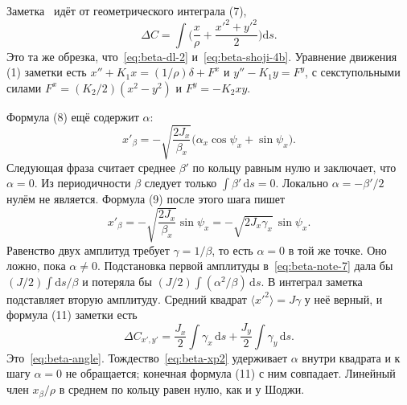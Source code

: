 \documentclass[aps,pra,preprint,a4paper,amsmath,amssymb,longbibliography]{revtex4-2}
\begin{document}
Заметка~\cite{SenichevNote} идёт от геометрического интеграла (7),
\begin{equation}
\label{eq:beta-note-7}
\Delta C
=\int\Biggl(\frac{x}{\rho}+\frac{x'^2+y'^2}{2}\Biggr)\mathrm{d}s.
\end{equation}
Это та же обрезка, что~\eqref{eq:beta-dl-2} и~\eqref{eq:beta-shoji-4b}. Уравнение движения (1) заметки есть $x''+K_1 x=(1/\rho)\delta+F^x$ и $y''-K_1 y=F^y$, с секступольными силами $F^x=(K_2/2)(x^2-y^2)$ и $F^y=-K_2 xy$.

Формула (8) ещё содержит $\alpha$:
\begin{equation}
\label{eq:beta-note-8}
x'_\beta
=-\sqrt{\frac{2J_x}{\beta_x}}
\bigl(\alpha_x\cos\psi_x+\sin\psi_x\bigr).
\end{equation}
Следующая фраза считает среднее $\beta'$ по кольцу равным нулю и заключает, что $\alpha=0$. Из периодичности $\beta$ следует только $\int\beta'\,\mathrm{d}s=0$. Локально $\alpha=-\beta'/2$ нулём не является. Формула (9) после этого шага пишет
\begin{equation}
\label{eq:beta-note-9}
x'_\beta
=-\sqrt{\frac{2J_x}{\beta_x}}\sin\psi_x
=-\sqrt{2J_x\gamma_x}\,\sin\psi_x.
\end{equation}
Равенство двух амплитуд требует $\gamma=1/\beta$, то есть $\alpha=0$ в той же точке. Оно ложно, пока $\alpha\neq 0$. Подстановка первой амплитуды в~\eqref{eq:beta-note-7} дала бы $(J/2)\int\mathrm{d}s/\beta$ и потеряла бы $(J/2)\int(\alpha^2/\beta)\,\mathrm{d}s$. В интеграл заметка подставляет вторую амплитуду. Средний квадрат $\langle x'^2\rangle=J\gamma$ у неё верный, и формула (11) заметки есть
\begin{equation}
\label{eq:beta-note-11}
\Delta C_{x',y'}
=\frac{J_x}{2}\int\gamma_x\,\mathrm{d}s
+\frac{J_y}{2}\int\gamma_y\,\mathrm{d}s.
\end{equation}
Это~\eqref{eq:beta-angle}. Тождество~\eqref{eq:beta-xp2} удерживает $\alpha$ внутри квадрата и к шагу $\alpha=0$ не обращается; конечная формула (11) с ним совпадает. Линейный член $x_\beta/\rho$ в среднем по кольцу равен нулю, как и у Шоджи.
\end{document}
